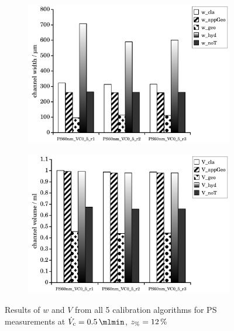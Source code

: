 \begin{figure}[!hb]
  \begin{center}
    \begin{subfigure}{\subFigSize}
      \includegraphics[width=\linewidth]{./images/data/eval_own_p12/calibW_PS_VC_0_5_p12.pdf}
    \end{subfigure}
    \begin{subfigure}{\subFigSize}
      \includegraphics[width=\linewidth]{./images/data/eval_own_p12/calibV_PS_VC_0_5_p12.pdf}
    \end{subfigure}
 \end{center}
  \vspace*{-4ex}    
  \caption[Results of $w$ and $V$ from all 5 calibration algorithms for PS measurements at
  $\Vc = \SI{0.5}{\mlmin}$, $\zP = \SI{12}{\percent}$]{
    Results of $w$ and $V$ from all 5 calibration algorithms for PS measurements at
    $\Vc = \SI{0.5}{\mlmin}$, $\zP = \SI{12}{\percent}$
  }
  \label{fig:calibRes_PS_VC0_5}
\end{figure}
\FloatBarrier
